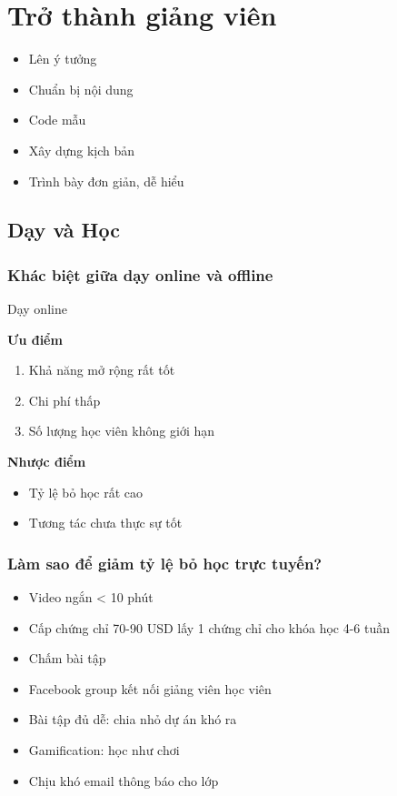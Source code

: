 \chapter{Trở thành giảng viên}


\begin{itemize}
  \item Lên ý tưởng
  \item Chuẩn bị nội dung
  \item Code mẫu
  \item Xây dựng kịch bản
  \item Trình bày đơn giản, dễ hiểu
\end{itemize}

\section{Dạy và Học}

\subsection{Khác biệt giữa dạy online và offline}

Dạy online

\textbf{Ưu điểm}

\begin{enumerate}
  \item Khả năng mở rộng rất tốt
  \item Chi phí thấp
  \item Số lượng học viên không giới hạn
\end{enumerate}

\textbf{Nhược điểm}

\begin{itemize}
  \item Tỷ lệ bỏ học rất cao
  \item Tương tác chưa thực sự tốt
\end{itemize}

\subsection{Làm sao để giảm tỷ lệ bỏ học trực tuyến?}

\begin{itemize}
  \item Video ngắn < 10 phút
  \item Cấp chứng chỉ 70-90 USD lấy 1 chứng chỉ cho khóa học 4-6 tuần
  \item Chấm bài tập
  \item Facebook group kết nối giảng viên học viên
  \item Bài tập đủ dễ: chia nhỏ dự án khó ra
  \item Gamification: học như chơi
  \item Chịu khó email thông báo cho lớp
\end{itemize}

